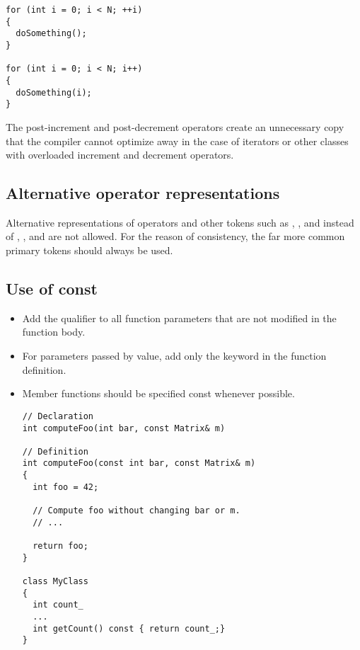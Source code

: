 \begin{lstlisting}[showspaces=false]
for (int i = 0; i < N; ++i)
{
  doSomething();
}

for (int i = 0; i < N; i++)
{
  doSomething(i);
}
\end{lstlisting}

The post-increment and post-decrement operators create an unnecessary copy that the compiler cannot optimize away in the case of iterators or other classes with overloaded increment and decrement operators.

\subsection{Alternative operator representations}
Alternative representations of operators and other tokens such as , , and  instead of \inlinecode{&&}, \inlinecode{||}, and \inlinecode{!} are not allowed.
For the reason of consistency, the far more common primary tokens should always be used.

\subsection{Use of const}
\begin{itemize}
\item Add the  qualifier to all function parameters that are not modified in the function body.
\item For parameters passed by value, add only the keyword in the function definition.
\item Member functions should be specified const whenever possible.

\begin{lstlisting}[showspaces=false]
// Declaration
int computeFoo(int bar, const Matrix& m)

// Definition
int computeFoo(const int bar, const Matrix& m)
{
  int foo = 42;

  // Compute foo without changing bar or m.
  // ...

  return foo;
}

class MyClass
{
  int count_
  ...
  int getCount() const { return count_;}
}
\end{lstlisting}

\end{itemize}


